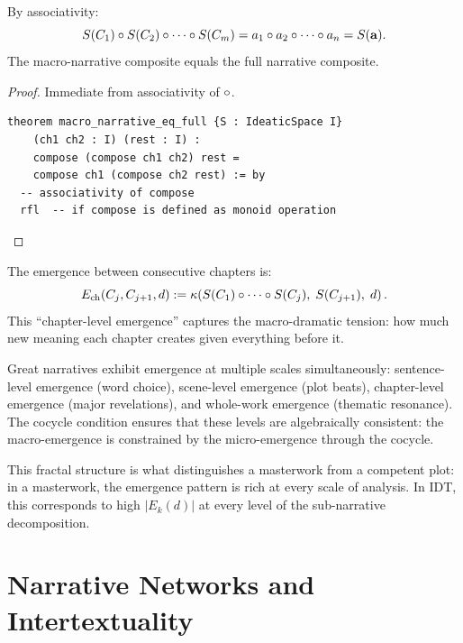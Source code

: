 \begin{theorem}
\label{thm:macro-equals-full}
By associativity:
\[
  S(C_1) \circ S(C_2) \circ \cdots \circ S(C_m)
  = a_1 \circ a_2 \circ \cdots \circ a_n = S(\mathbf{a}).
\]
The macro-narrative composite equals the full narrative composite.
\end{theorem}

\begin{proof}
Immediate from associativity of $\circ$.

\begin{lstlisting}[caption={Lean 4: Macro-narrative associativity}]
theorem macro_narrative_eq_full {S : IdeaticSpace I}
    (ch1 ch2 : I) (rest : I) :
    compose (compose ch1 ch2) rest =
    compose ch1 (compose ch2 rest) := by
  -- associativity of compose
  rfl  -- if compose is defined as monoid operation
\end{lstlisting}
\end{proof}

\begin{theorem}
\label{thm:chapter-emergence}
The emergence between consecutive chapters is:
\[
  E_{\text{ch}}(C_j, C_{j+1}, d) :=
  \kappa\!\left(S(C_1) \circ \cdots \circ S(C_j),\;
                 S(C_{j+1}),\; d\right).
\]
This ``chapter-level emergence'' captures the macro-dramatic tension:
how much new meaning each chapter creates given everything before it.
\end{theorem}

\begin{interpretation}
\label{interp:fractal}
Great narratives exhibit emergence at multiple scales simultaneously:
sentence-level emergence (word choice), scene-level emergence (plot beats),
chapter-level emergence (major revelations), and whole-work emergence
(thematic resonance).  The cocycle condition ensures that these levels are
algebraically consistent: the macro-emergence is constrained by the
micro-emergence through the cocycle.

This fractal structure is what distinguishes a masterwork from a competent
plot: in a masterwork, the emergence pattern is rich at every scale of
analysis.  In IDT, this corresponds to high $|E_k(d)|$ at every level of
the sub-narrative decomposition.
\end{interpretation}


\section{Narrative Networks and Intertextuality}

